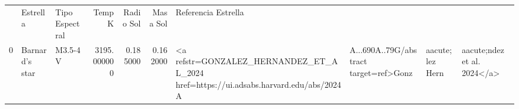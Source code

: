 \begin{tabular}{lllrrrl}
 & Estrella & Tipo Espectral & Temp K & Radio Sol & Masa Sol & Referencia Estrella \\
0 & Barnard's star & M3.5-4 V & 3195.000000 & 0.185000 & 0.162000 & <a refstr=GONZALEZ_HERNANDEZ_ET_AL_2024 href=https://ui.adsabs.harvard.edu/abs/2024A&A...690A..79G/abstract target=ref>Gonz&aacute;lez Hern&aacute;ndez et al. 2024</a> \\
\end{tabular}

